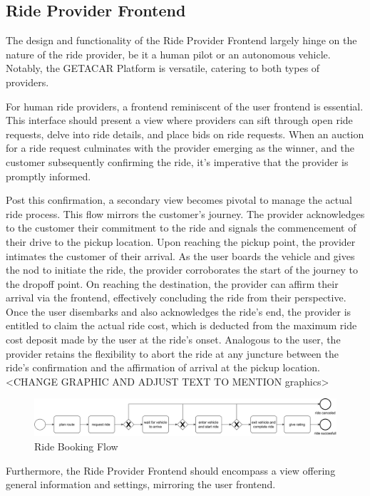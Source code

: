\subsection{Ride Provider Frontend}
The design and functionality of the Ride Provider Frontend largely hinge on the nature of the ride provider, be it a human pilot or an autonomous vehicle. Notably, the GETACAR Platform is versatile, catering to both types of providers.

For human ride providers, a frontend reminiscent of the user frontend is essential. This interface should present a view where providers can sift through open ride requests, delve into ride details, and place bids on ride requests. When an auction for a ride request culminates with the provider emerging as the winner, and the customer subsequently confirming the ride, it's imperative that the provider is promptly informed.

Post this confirmation, a secondary view becomes pivotal to manage the actual ride process. This flow mirrors the customer's journey. The provider acknowledges to the customer their commitment to the ride and signals the commencement of their drive to the pickup location. Upon reaching the pickup point, the provider intimates the customer of their arrival. As the user boards the vehicle and gives the nod to initiate the ride, the provider corroborates the start of the journey to the dropoff point. On reaching the destination, the provider can affirm their arrival via the frontend, effectively concluding the ride from their perspective. Once the user disembarks and also acknowledges the ride's end, the provider is entitled to claim the actual ride cost, which is deducted from the maximum ride cost deposit made by the user at the ride's onset. Analogous to the user, the provider retains the flexibility to abort the ride at any juncture between the ride's confirmation and the affirmation of arrival at the pickup location.
<CHANGE GRAPHIC AND ADJUST TEXT TO MENTION graphics>

\begin{figure}[h]
    \centering
    \includegraphics[width=\linewidth]{data/3.svg}
    \caption{Ride Booking Flow}
    \label{fig:directSVG}
\end{figure}

Furthermore, the Ride Provider Frontend should encompass a view offering general information and settings, mirroring the user frontend.

